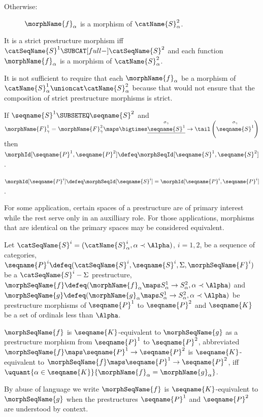 \documentclass{article}
\begin{document}
\begin{definition}
\begin{description}
\item[Otherwise:]
$\morphName{f}_\alpha$ is a morphism of $\catName{S}^2_\alpha$.
\end{description}

It is a strict prestructure morphism iff
$\catSeqName{S}^1 \SUBCAT[full-] \catSeqName{S}^2$ and each function
$\morphName{f}_\alpha$ is a morphism of $\catName{S}^2_\alpha$.

\begin{remark}
It is not sufficient to require that each $\morphName{f}_\alpha$ be a
morphism of $\catName{S}^1_\alpha \unioncat \catName{S}^2_\alpha$
because that would not ensure that the composition of strict
prestructure morphisms is strict.
\end{remark}

If $\seqname{S}^1 \SUBSETEQ \seqname{S}^2$ and
$
  \morphName{F}^1_\gamma =
  \morphName{F}^2_\gamma \maps
    \bigtimes \underline{\overset{\sigma_\gamma}{\seqname{S}^1}} \to
    \tail \left ( \overset{\sigma_\gamma}{\seqname{S}^1} \right )
$
then
$
  \morphId[{{\seqname{P}^1},{\seqname{P}^2}}] \defeq
  \morphSeqId[{{\seqname{S}^1},{\seqname{S}^2}}]
$.

$
  \morphId[{\seqname{P}^i}] \defeq
  \morphSeqId[{\seqname{S}^i}] = \morphId[{{\seqname{P}^i},{\seqname{P}^i}}]
$.
\end{definition}

For some application, certain spaces of a prestructure are of primary
interest while the rest serve only in an auxilliary role. For those
applications, morphisms that are identical on the primary spaces may
be considered equivalent.

\begin{definition}
\label{def:premorphKequiv}
Let $\catSeqName{S}^i=(\catName{S}^i_\alpha, \alpha \prec \Alpha)$,
$i=1,2$, be a sequence of categories,
$
  \seqname{P}^i \defeq
  (\catSeqName{S}^i, \seqname{S}^i, \Sigma, \morphSeqName{F}^i)
$
be a $\catSeqName{S}^i-\Sigma$ prestructure,
$
  \morphSeqName{f} \defeq
    (
      \morphName{f}_\alpha \maps S^1_\alpha \to S^2_\alpha,
      \alpha \prec \Alpha
    )
$
and
$
  \morphSeqName{g} \defeq
    (
      \morphName{g}_\alpha \maps S^1_\alpha \to S^2_\alpha,
      \alpha \prec \Alpha
    )
$
be prestructure morphisms of $\seqname{P}^1$ to $\seqname{P}^2$ and
$\seqname{K}$ be a set of ordinals less than $\Alpha$.

$\morphSeqName{f}$ is $\seqname{K}$-equivalent to $\morphSeqName{g}$ as a
prestructure morphism from $\seqname{P}^1$ to $\seqname{P}^2$,
abbreviated $\morphSeqName{f} \maps \seqname{P}^1 \to \seqname{P}^2$ is
$\seqname{K}$-equivalent to
$\morphSeqName{f} \maps \seqname{P}^1 \to \seqname{P}^2$, iff
$
  \uquant
    {\alpha \in \seqname{K}}
    {\morphName{f}_\alpha = \morphName{g}_\alpha}
$.

By abuse of language we write $\morphSeqName{f}$ is
$\seqname{K}$-equivalent to $\morphSeqName{g}$ when the prestructures
$\seqname{P}^1$ and $\seqname{P}^2$ are understood by context.
\end{definition}
\end{document}

